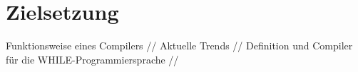 \section{Zielsetzung}
Funktionsweise eines Compilers //
Aktuelle Trends //
Definition und Compiler für die WHILE-Programmiersprache //